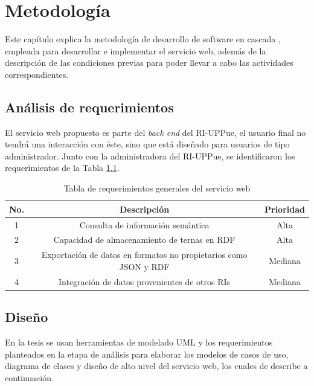 \renewcommand{\chaptername}{Capitulo}
\chapter{Metodolog\'ia} 

Este cap\'itulo explica la metodolog\'ia de desarrollo de software en cascada \cite{IngDeSW}, empleada para desarrollar e implementar el servicio web, adem\'as de la descripci\'on de las condiciones previas para poder llevar a cabo las actividades correspondientes. 

\section{An\'alisis de requerimientos}

El servicio web propuesto es parte del \emph{back end} del RI-UPPue,  el usuario final no tendr\'a una interacci\'on con \'este, sino que est\'a dise\~{n}ado para usuarios de tipo administrador. Junto con la administradora del RI-UPPue, se identificaron los requerimientos de la Tabla \ref{tablaRequerimientos}. 

\begin{table}[htbp]
    \begin{center}
    \caption{Tabla de requerimientos generales del servicio web}
    \begin{tabular}{|c|c|c|}
    \hline
    \centering \textbf{No. } & \textbf{Descripci\'on} & \textbf{Prioridad} \\
    \hline \hline
    1 & Consulta de informaci\'on sem\'antica & Alta  \\ \hline
    2 & Capacidad de almacenamiento de ternas en RDF & Alta  \\ \hline
    3 & Exportaci\'on de datos en formatos no propietarios como JSON y RDF & Mediana  \\ \hline
    4 & Integraci\'on de datos provenientes de otros RIs & Mediana  \\ \hline
    \end{tabular}
    \label{tablaRequerimientos}
    \end{center}
\end{table}

\section{Dise\~{n}o}

En la tesis se usan herramientas de modelado UML y los requerimientos planteados en la etapa de an\'alisis para elaborar los modelos de casos de uso, diagrama de clases y dise\~{n}o de alto nivel del servicio web, los cuales de describe a continuaci\'on.


